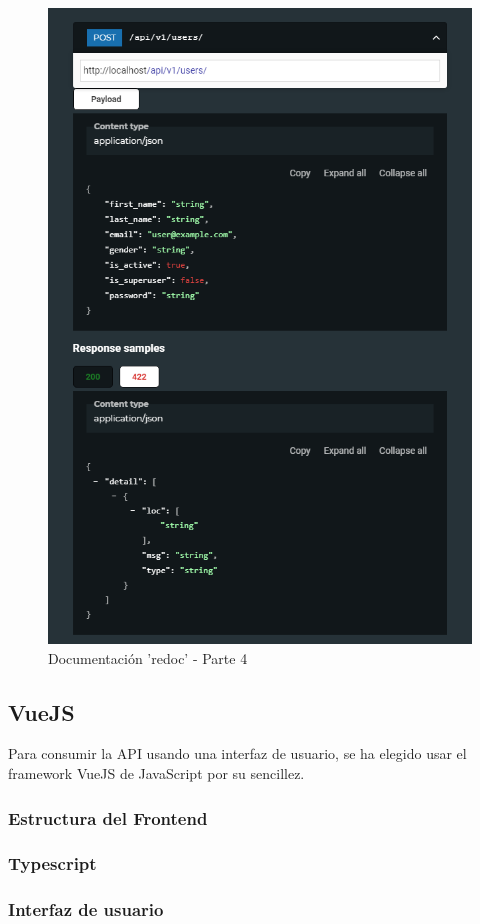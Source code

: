 \begin{figure}[!htb]
    \centering
    \includegraphics[scale=.40]{TT/img/implementacion/redoc_4.png}
    \caption{Documentación 'redoc' - Parte 4}
    \label{graphic:redoc4}
\end{figure}

\subsection{VueJS}
Para consumir la API usando una interfaz de usuario, se ha elegido usar el framework VueJS de JavaScript por su sencillez.
\subsubsection{Estructura del Frontend}
\subsubsection{Typescript}
\subsubsection{Interfaz de usuario}

